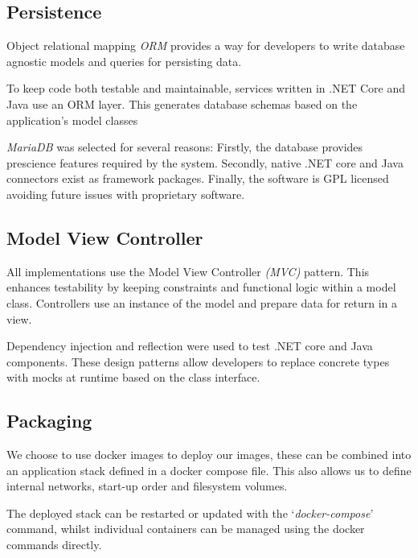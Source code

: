 \subsection{Persistence}
    \par
    Object relational mapping \textit{ORM} provides a way for developers to write database agnostic models and queries for persisting data. 
    
    \par
    To keep code both testable and maintainable, services written in .NET Core and Java use an ORM layer. This generates database schemas based on the application's model classes

    \par
    \textit{MariaDB}\cite{MariaDB} was selected for several reasons: Firstly, the database provides prescience features required by the system. Secondly, native .NET core and Java connectors exist as framework packages. Finally, the software is GPL licensed avoiding future issues with proprietary software.

\subsection{Model View Controller}
    \par
    All implementations use the Model View Controller \textit{(MVC)}
    pattern. This enhances testability by keeping constraints and functional logic within a model class. Controllers use an instance of the model and prepare data for return in a view.

    \par
    Dependency injection and reflection were used to test .NET core and Java components. These design patterns allow developers to replace concrete types with mocks at runtime based on the class interface.

\subsection{Packaging}
    \par
    We choose to use docker images to deploy our images, these can be combined into an application stack defined in a docker compose file. This also allows us to define internal networks, start-up order and filesystem volumes.

    \par
    The deployed stack can be restarted or updated with the `\textit{docker-compose}' command, whilst individual containers can be managed using the docker commands directly.